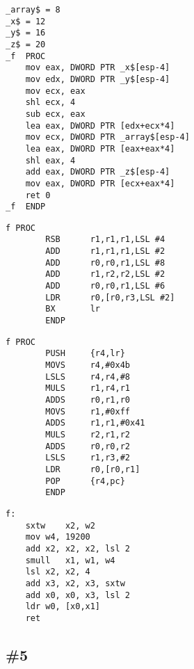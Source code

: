 \begin{lstlisting}[caption=\Optimizing MSVC 2010]
_array$ = 8	
_x$ = 12	
_y$ = 16	
_z$ = 20	
_f	PROC
	mov	eax, DWORD PTR _x$[esp-4]
	mov	edx, DWORD PTR _y$[esp-4]
	mov	ecx, eax
	shl	ecx, 4
	sub	ecx, eax
	lea	eax, DWORD PTR [edx+ecx*4]
	mov	ecx, DWORD PTR _array$[esp-4]
	lea	eax, DWORD PTR [eax+eax*4]
	shl	eax, 4
	add	eax, DWORD PTR _z$[esp-4]
	mov	eax, DWORD PTR [ecx+eax*4]
	ret	0
_f	ENDP
\end{lstlisting}

\begin{lstlisting}[caption=\NonOptimizingKeilVI (\ARMMode)]
f PROC
        RSB      r1,r1,r1,LSL #4
        ADD      r1,r1,r1,LSL #2
        ADD      r0,r0,r1,LSL #8
        ADD      r1,r2,r2,LSL #2
        ADD      r0,r0,r1,LSL #6
        LDR      r0,[r0,r3,LSL #2]
        BX       lr
        ENDP
\end{lstlisting}

\begin{lstlisting}[caption=\NonOptimizingKeilVI (\ThumbMode)]
f PROC
        PUSH     {r4,lr}
        MOVS     r4,#0x4b
        LSLS     r4,r4,#8
        MULS     r1,r4,r1
        ADDS     r0,r1,r0
        MOVS     r1,#0xff
        ADDS     r1,r1,#0x41
        MULS     r2,r1,r2
        ADDS     r0,r0,r2
        LSLS     r1,r3,#2
        LDR      r0,[r0,r1]
        POP      {r4,pc}
        ENDP
\end{lstlisting}

\begin{lstlisting}[caption=\Optimizing GCC 4.9 (ARM64)]
f:
	sxtw	x2, w2
	mov	w4, 19200
	add	x2, x2, x2, lsl 2
	smull	x1, w1, w4
	lsl	x2, x2, 4
	add	x3, x2, x3, sxtw
	add	x0, x0, x3, lsl 2
	ldr	w0, [x0,x1]
	ret
\end{lstlisting}



\Answer\: 

\subsection{\Exercise \#5}
\label{exercise_array_5}

\WhatThisCodeDoes\

